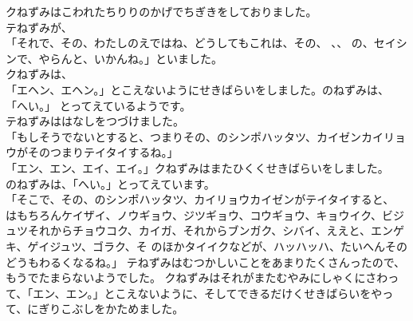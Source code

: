 \documentclass[
    a4paper,
    10pt,
    book]
    {tarticle}
\begin{document}
\indent クねずみはこわれたちりりのかげでちぎきをしておりました。\\
\indent テねずみが、\\
「それで、その、わたしのえではね、どうしてもこれは、その、
、、
の、セイシンで、やらんと、いかんね。」といました。\\
\indent クねずみは、\\
「エヘン、エヘン。」とこえないようにせきばらいをしました。のねずみは、
「へい。」
\newpage
\thispagestyle{fancy}
とってえているようです。\\
\indent テねずみははなしをつづけました。\\
「もしそうでないとすると、つまりその、のシンポハッタツ、カイゼンカイリョウがそのつまりテイタイするね。」\\
「エン、エン、エイ、エイ。」クねずみはまたひくくせきばらいをしました。\\
\indent {}のねずみは、「へい。」とってえています。\\
「そこで、その、のシンポハッタツ、カイリョウカイゼンがテイタイすると、
はもちろんケイザイ、ノウギョウ、ジツギョウ、コウギョウ、キョウイク、ビジュツそれからチョウコク、カイガ、それからブンガク、シバイ、ええと、エンゲキ、ゲイジュツ、ゴラク、そ
のほかタイイクなどが、ハッハッハ、たいへんそのどうもわるくなるね。」
テねずみはむつかしいことをあまりたくさんったので、もうでたまらないようでした。
クねずみはそれがまたむやみにしゃくにさわって、「エン、エン。」とこえないように、そしてできるだけくせきばらいをやって、にぎりこぶしをかためました。\\
\end{document}

